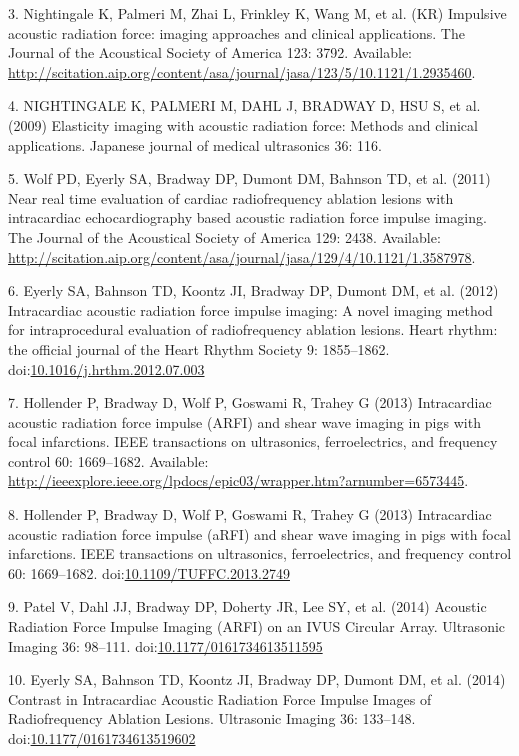 \documentclass[]{article}
\begin{document}
3. Nightingale K, Palmeri M, Zhai L, Frinkley K, Wang M, et al. (KR)
Impulsive acoustic radiation force: imaging approaches and clinical
applications. The Journal of the Acoustical Society of America 123:
3792. Available:
\url{http://scitation.aip.org/content/asa/journal/jasa/123/5/10.1121/1.2935460}.

4. NIGHTINGALE K, PALMERI M, DAHL J, BRADWAY D, HSU S, et al. (2009)
Elasticity imaging with acoustic radiation force: Methods and clinical
applications. Japanese journal of medical ultrasonics 36: 116.

5. Wolf PD, Eyerly SA, Bradway DP, Dumont DM, Bahnson TD, et al. (2011)
Near real time evaluation of cardiac radiofrequency ablation lesions
with intracardiac echocardiography based acoustic radiation force
impulse imaging. The Journal of the Acoustical Society of America 129:
2438. Available:
\url{http://scitation.aip.org/content/asa/journal/jasa/129/4/10.1121/1.3587978}.

6. Eyerly SA, Bahnson TD, Koontz JI, Bradway DP, Dumont DM, et al.
(2012) Intracardiac acoustic radiation force impulse imaging: A novel
imaging method for intraprocedural evaluation of radiofrequency ablation
lesions. Heart rhythm: the official journal of the Heart Rhythm Society
9: 1855--1862.
doi:\href{http://dx.doi.org/10.1016/j.hrthm.2012.07.003}{10.1016/j.hrthm.2012.07.003}

7. Hollender P, Bradway D, Wolf P, Goswami R, Trahey G (2013)
Intracardiac acoustic radiation force impulse (ARFI) and shear wave
imaging in pigs with focal infarctions. IEEE transactions on
ultrasonics, ferroelectrics, and frequency control 60: 1669--1682.
Available:
\url{http://ieeexplore.ieee.org/lpdocs/epic03/wrapper.htm?arnumber=6573445}.

8. Hollender P, Bradway D, Wolf P, Goswami R, Trahey G (2013)
Intracardiac acoustic radiation force impulse (aRFI) and shear wave
imaging in pigs with focal infarctions. IEEE transactions on
ultrasonics, ferroelectrics, and frequency control 60: 1669--1682.
doi:\href{http://dx.doi.org/10.1109/TUFFC.2013.2749}{10.1109/TUFFC.2013.2749}

9. Patel V, Dahl JJ, Bradway DP, Doherty JR, Lee SY, et al. (2014)
Acoustic Radiation Force Impulse Imaging (ARFI) on an IVUS Circular
Array. Ultrasonic Imaging 36: 98--111.
doi:\href{http://dx.doi.org/10.1177/0161734613511595}{10.1177/0161734613511595}

10. Eyerly SA, Bahnson TD, Koontz JI, Bradway DP, Dumont DM, et al.
(2014) Contrast in Intracardiac Acoustic Radiation Force Impulse Images
of Radiofrequency Ablation Lesions. Ultrasonic Imaging 36: 133--148.
doi:\href{http://dx.doi.org/10.1177/0161734613519602}{10.1177/0161734613519602}
\end{document}
